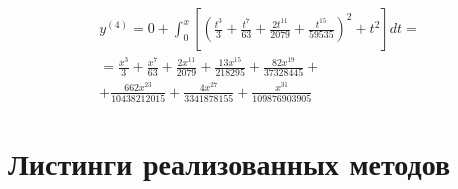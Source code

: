 \begin{equation}
	\begin{split}
		y^{(4)} = 0 + \int_{0}^{x}\left[ \left( \frac{t^3}{3} + \frac{t^7}{63} + \frac{2t^{11}}{2079} + \frac{t^{15}}{59535} \right)^2 + t^2 \right] dt = \\ 
		= \frac{x^3}{3} + \frac{x^{7}}{63} + \frac{2x^{11}}{2079} + \frac{13x^{15}}{218295} + \frac{82x^{19}}{37328445} + \\
		+ \frac{662x^{23}}{10438212015} + \frac{4x^{27}}{3341878155} + \frac{x^{31}}{109876903905}
	\end{split}
\end{equation}

\chapter{Листинги реализованных методов}


